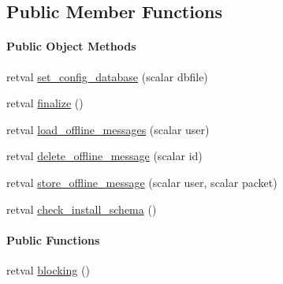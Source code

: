 \subsection*{\-Public \-Member \-Functions}
\begin{Indent}\paragraph*{\-Public \-Object \-Methods}
\begin{DoxyCompactItemize}
\item 
retval \hyperlink{class_d_jabberd_1_1_delivery_1_1_offline_storage_1_1_s_q_lite_a6c46db852e0883ab3fd63e12e5f6c40e}{set\-\_\-config\-\_\-database} (scalar dbfile)
\item 
retval \hyperlink{class_d_jabberd_1_1_delivery_1_1_offline_storage_1_1_s_q_lite_a9bc43a22c549ad842ef7ee8d2354b670}{finalize} ()
\item 
retval \hyperlink{class_d_jabberd_1_1_delivery_1_1_offline_storage_1_1_s_q_lite_a33b1c9c88245c2a5b802a9bddc7f1fd5}{load\-\_\-offline\-\_\-messages} (scalar user)
\item 
retval \hyperlink{class_d_jabberd_1_1_delivery_1_1_offline_storage_1_1_s_q_lite_a3c24aee0bb330b52ce56a14e5233b9ed}{delete\-\_\-offline\-\_\-message} (scalar id)
\item 
retval \hyperlink{class_d_jabberd_1_1_delivery_1_1_offline_storage_1_1_s_q_lite_a5089899f4cc5720d932324fc41a22154}{store\-\_\-offline\-\_\-message} (scalar user, scalar packet)
\item 
retval \hyperlink{class_d_jabberd_1_1_delivery_1_1_offline_storage_1_1_s_q_lite_ab90b4e48009e28b6291d3f0fe4c5d5bf}{check\-\_\-install\-\_\-schema} ()
\end{DoxyCompactItemize}
\end{Indent}
\begin{Indent}\paragraph*{\-Public \-Functions}
\begin{DoxyCompactItemize}
\item 
retval \hyperlink{class_d_jabberd_1_1_delivery_1_1_offline_storage_1_1_s_q_lite_aff20f49c411a6f3540bbefeac6b5c8b1}{blocking} ()
\end{DoxyCompactItemize}
\end{Indent}


